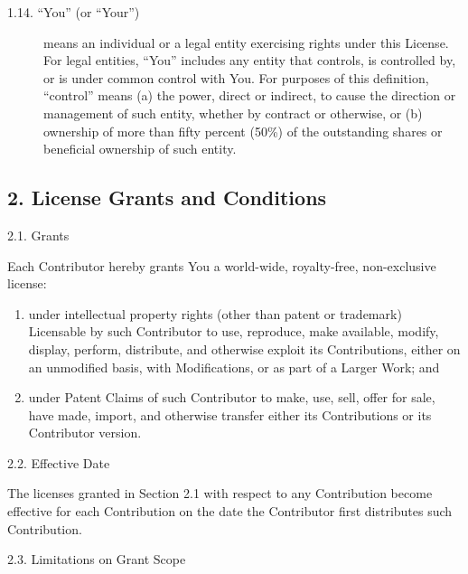 \documentclass[letterpaper,10pt,english]{sphinxmanual}
\begin{document}
\begin{description}
\item[{1.14. “You” (or “Your”)}] \leavevmode
means an individual or a legal entity exercising rights under this
License. For legal entities, “You” includes any entity that
controls, is controlled by, or is under common control with You. For
purposes of this definition, “control” means (a) the power, direct
or indirect, to cause the direction or management of such entity,
whether by contract or otherwise, or (b) ownership of more than
fifty percent (50\%) of the outstanding shares or beneficial
ownership of such entity.

\end{description}


\subsection{2. License Grants and Conditions}
\label{\detokenize{warranty:license-grants-and-conditions}}
2.1. Grants

Each Contributor hereby grants You a world-wide, royalty-free,
non-exclusive license:
\begin{enumerate}
\def\theenumi{\alph{enumi}}
\def\labelenumi{(\theenumi )}
\makeatletter\def\p@enumii{\p@enumi (\theenumi )}\makeatother
\item {} 
under intellectual property rights (other than patent or trademark)
Licensable by such Contributor to use, reproduce, make available,
modify, display, perform, distribute, and otherwise exploit its
Contributions, either on an unmodified basis, with Modifications, or
as part of a Larger Work; and

\item {} 
under Patent Claims of such Contributor to make, use, sell, offer
for sale, have made, import, and otherwise transfer either its
Contributions or its Contributor version.

\end{enumerate}

2.2. Effective Date

The licenses granted in Section 2.1 with respect to any Contribution
become effective for each Contribution on the date the Contributor first
distributes such Contribution.

2.3. Limitations on Grant Scope
\end{document}
